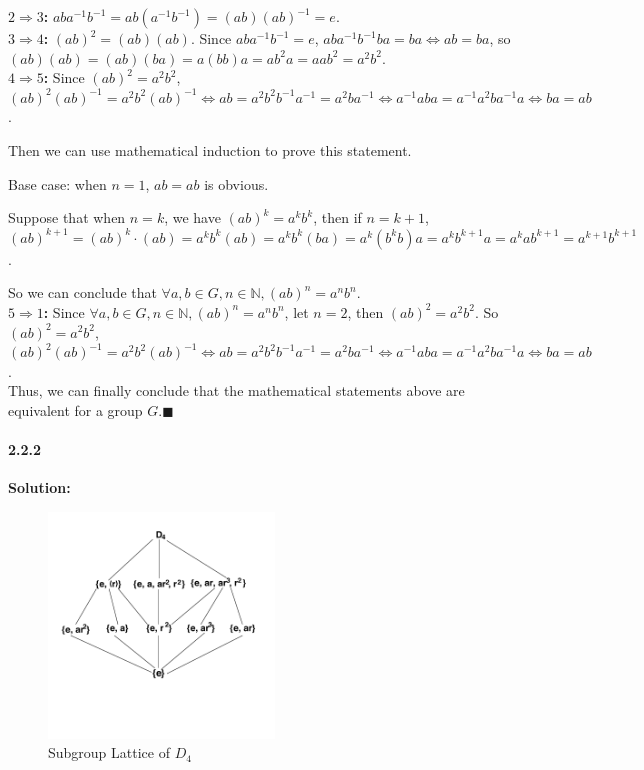 \documentclass[11pt]{article}
\begin{document}
				\textbf{$2 \Rightarrow 3$: } $aba^{-1}b^{-1} = ab(a^{-1}b^{-1}) = (ab)(ab)^{-1} = e$.\\
				
				\textbf{$3 \Rightarrow 4$: }$(ab)^2 = (ab)(ab)$. Since $aba^{-1}b^{-1} = e$, $aba^{-1}b^{-1}ba = ba \Leftrightarrow ab = ba$, so $(ab)(ab) = (ab)(ba) = a(bb)a = ab^2a = aab^2 = a^2b^2$.\\
				
				\textbf{$4 \Rightarrow 5$: }Since $(ab)^2 = a^2b^2$, $(ab)^2(ab)^{-1} =  a^2b^2(ab)^{-1} \Leftrightarrow ab = a^2b^2b^{-1}a^{-1} = a^2ba^{-1} \Leftrightarrow a^{-1}aba = a^{-1}a^2ba^{-1}a \Leftrightarrow ba = ab$.
				
				Then we can use mathematical induction to prove this statement.
				
				Base case: when $n = 1$, $ab = ab$ is obvious.
				
				Suppose that when $n = k$, we have $(ab)^k = a^kb^k$, then if $n = k + 1$, $(ab)^{k + 1} = (ab)^k \cdot (ab) = a^kb^k(ab) = a^kb^k(ba) = a^k(b^kb)a = a^kb^{k + 1}a = a^kab^{k + 1} = a^{k + 1}b^{k + 1}$.
				
				So we can conclude that $\forall a,b \in G, n \in \mathbb{N}, (ab)^{n} = a^{n}b^{n}$.\\
				
				 \textbf{$5 \Rightarrow 1$: }Since $\forall a,b \in G, n \in \mathbb{N}, (ab)^{n} = a^{n}b^{n}$, let $n = 2$, then $(ab)^2 = a^2b^2$. So $(ab)^2 = a^2b^2$, $(ab)^2(ab)^{-1} =  a^2b^2(ab)^{-1} \Leftrightarrow ab = a^2b^2b^{-1}a^{-1} = a^2ba^{-1} \Leftrightarrow a^{-1}aba = a^{-1}a^2ba^{-1}a \Leftrightarrow ba = ab$.\\
				 
				Thus, we can finally conclude that the  mathematical statements above are equivalent for a group $G$.$\blacksquare$
\paragraph{2.2.2}\textbf{Solution:}
	\begin{figure}[H]
        \begin{center}
        \includegraphics[width=6cm]{./imgs/D_4.png}
        \caption{Subgroup Lattice of $D_4$}
        \end{center}
    \end{figure}
	
\end{document}
